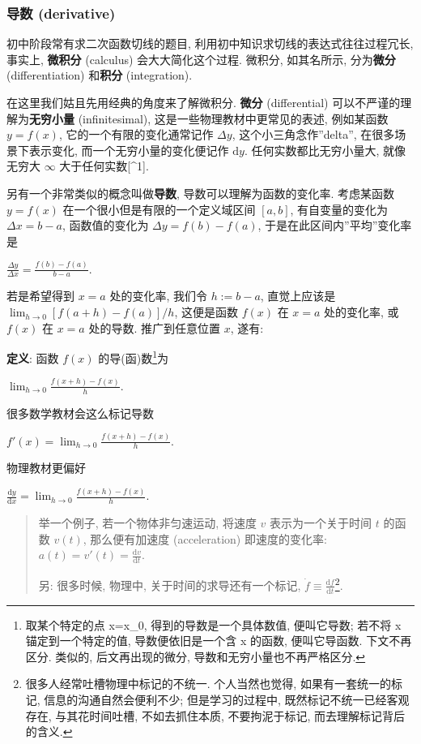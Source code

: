 \hypertarget{ux5bfcux6570-derivative}{%
\subsubsection{导数 (derivative)}\label{ux5bfcux6570-derivative}}

初中阶段常有求二次函数切线的题目,
利用初中知识求切线的表达式往往过程冗长, 事实上, \textbf{微积分}
(calculus) 会大大简化这个过程. 微积分, 如其名所示, 分为\textbf{微分}
(differentiation) 和\textbf{积分 }(integration).

在这里我们姑且先用经典的角度来了解微积分. \textbf{微分} (differential)
可以不严谨的理解为\textbf{无穷小量} (infinitesimal),
这是一些物理教材中更常见的表述, 例如某函数 \(y=f(x)\),
它的一个有限的变化通常记作 \(\Delta y\), 这个小三角念作''delta'',
在很多场景下表示变化, 而一个无穷小量的变化便记作 \(\mathrm{d}y\).
任何实数都比无穷小量大, 就像无穷大 \(\infty\) 大于任何实数{[}\^{}1{]}.

另有一个非常类似的概念叫做\textbf{导数}, 导数可以理解为函数的变化率.
考虑某函数 \(y=f(x)\) 在一个很小但是有限的一个定义域区间 \([a,b]\),
有自变量的变化为 \(\Delta x=b-a\), 函数值的变化为
\(\Delta y= f(b)-f(a)\), 于是在此区间内''平均''变化率是

\(\frac{\Delta y}{\Delta x}=\frac{f(b)-f(a)}{b-a}.\)

若是希望得到 \(x=a\) 处的变化率, 我们令 \(h:=b-a\), 直觉上应该是
\(\lim_{h\rightarrow0}[f(a+h)-f(a)]/h\), 这便是函数 \(f(x)\) 在 \(x=a\)
处的变化率, 或 \(f(x)\) 在 \(x=a\) 处的导数. 推广到任意位置 \(x\), 遂有:

\textbf{定义}: 函数 \(f(x)\) 的导(函)数\footnote{取某个特定的点 x=x\_0,
  得到的导数是一个具体数值, 便叫它导数; 若不将 x 锚定到一个特定的值,
  导数便依旧是一个含 x 的函数, 便叫它导函数. 下文不再区分. 类似的,
  后文再出现的微分, 导数和无穷小量也不再严格区分.}为

\(\lim_{h\rightarrow0}\frac{f(x+h)-f(x)}{h}.\)

很多数学教材会这么标记导数

\(\boxed{f'(x)=\lim_{h\rightarrow0}\frac{f(x+h)-f(x)}{h}}.\)

物理教材更偏好

\(\frac{\mathrm{d}y}{\mathrm{d}x}=\lim_{h\rightarrow0}\frac{f(x+h)-f(x)}{h}.\)

\begin{quote}
举一个例子, 若一个物体非匀速运动, 将速度 \(v\) 表示为一个关于时间 \(t\)
的函数 \(v(t)\), 那么便有加速度 (acceleration) 即速度的变化率:
\(a(t)=v'(t)=\frac{\mathrm{d}v}{\mathrm{d}t}\).

另: 很多时候, 物理中, 关于时间的求导还有一个标记,
\(\dot{f}\equiv \frac{\mathrm{d}f}{\mathrm{d}t}\)\footnote{很多人经常吐槽物理中标记的不统一.
  个人当然也觉得, 如果有一套统一的标记, 信息的沟通自然会便利不少;
  但是学习的过程中, 既然标记不统一已经客观存在, 与其花时间吐槽,
  不如去抓住本质, 不要拘泥于标记, 而去理解标记背后的含义.}.
\end{quote}


